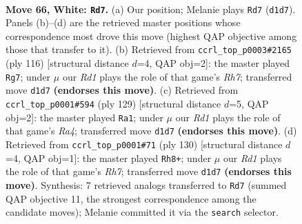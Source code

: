 \documentclass[11pt]{article}
\begin{document}
\clearpage

\begin{figure}[p]\centering
\begin{subfigure}{0.46\textwidth}\centering
\resizebox{\linewidth}{!}{%
\newchessgame
\chessboard[
  setfen={5r1k/P7/8/8/8/6K1/8/3R4 w - - 1 66},
  showmover=false,
  pgfstyle=straightmove, color=movearrow, markmove={d1-d7}
]}
\caption{}
\end{subfigure}\hfill
\begin{subfigure}{0.46\textwidth}\centering
\resizebox{\linewidth}{!}{%
\newchessgame
\chessboard[
  setfen={4k3/7R/4r3/3p4/3P4/5K2/8/8 w - - 5 59},
  showmover=false,
  pgfstyle=straightmove, color=movearrow, markmove={h7-g7}
]}
\caption{}
\end{subfigure}
\\[4pt]
\begin{subfigure}{0.46\textwidth}\centering
\resizebox{\linewidth}{!}{%
\newchessgame
\chessboard[
  setfen={3R4/1k6/3K4/r7/8/8/8/8 b - - 11 65},
  showmover=false,
  pgfstyle=straightmove, color=movearrow, markmove={a5-a1}
]}
\caption{}
\end{subfigure}\hfill
\begin{subfigure}{0.46\textwidth}\centering
\resizebox{\linewidth}{!}{%
\newchessgame
\chessboard[
  setfen={2k5/7R/3p4/K2P4/2r5/8/8/8 w - - 3 66},
  showmover=false,
  pgfstyle=straightmove, color=movearrow, markmove={h7-h8}
]}
\caption{}
\end{subfigure}
\caption{\textbf{Move 66, White: \texttt{Rd7}.} (a) Our position; Melanie plays \texttt{Rd7} (\texttt{d1d7}). Panels (b)--(d) are the retrieved master positions whose correspondence most drove this move (highest QAP objective among those that transfer to it). (b) Retrieved from \texttt{ccrl\_top\_p0003\#2165} (ply 116) [structural distance $d$=4, QAP obj=2]: the master played \texttt{Rg7}; under $\mu$ our \emph{Rd1} plays the role of that game's \emph{Rh7}; transferred move \texttt{d1d7} \textbf{(endorses this move)}. (c) Retrieved from \texttt{ccrl\_top\_p0001\#594} (ply 129) [structural distance $d$=5, QAP obj=2]: the master played \texttt{Ra1}; under $\mu$ our \emph{Rd1} plays the role of that game's \emph{Ra4}; transferred move \texttt{d1d7} \textbf{(endorses this move)}. (d) Retrieved from \texttt{ccrl\_top\_p0001\#71} (ply 130) [structural distance $d$=4, QAP obj=1]: the master played \texttt{Rh8+}; under $\mu$ our \emph{Rd1} plays the role of that game's \emph{Rh7}; transferred move \texttt{d1d7} \textbf{(endorses this move)}. Synthesis: 7 retrieved analogs transferred to \texttt{Rd7} (summed QAP objective 11, the strongest correspondence among the candidate moves); Melanie committed it via the \texttt{search} selector.}
\label{fig:thought-m130}
\end{figure}
\end{document}
